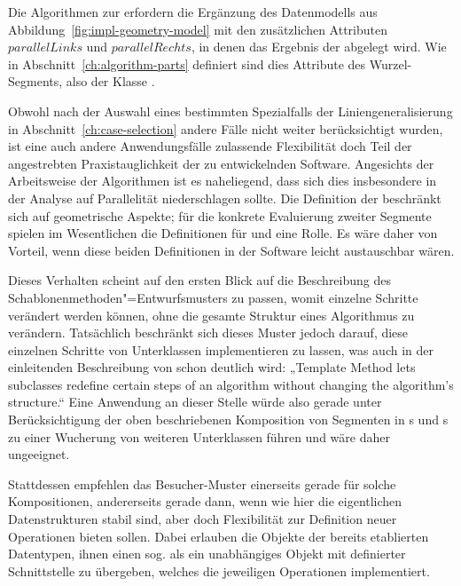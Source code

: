\documentclass[../main/thesis.tex]{subfiles}
\begin{document}
Die Algorithmen zur  erfordern die Ergänzung des Datenmodells aus Abbildung~\ref{fig:impl-geometry-model} mit den zusätzlichen Attributen $parallelLinks$ und $parallelRechts$, in denen das Ergebnis der  abgelegt wird.
Wie in Abschnitt~\ref{ch:algorithm-parts} definiert sind dies Attribute des Wurzel-Segments, also der Klasse .

Obwohl nach der Auswahl eines bestimmten Spezialfalls der Liniengeneralisierung in Abschnitt~\ref{ch:case-selection} andere Fälle nicht weiter berücksichtigt wurden, ist eine auch andere Anwendungsfälle zulassende Flexibilität doch Teil der angestrebten Praxistauglichkeit der zu entwickelnden Software.
Angesichts der Arbeitsweise der Algorithmen ist es naheliegend, dass sich dies insbesondere in der Analyse auf Parallelität niederschlagen sollte.
Die Definition der  beschränkt sich auf geometrische Aspekte; für die konkrete Evaluierung zweiter Segmente spielen im Wesentlichen die Definitionen für  und  eine Rolle.
Es wäre daher von Vorteil, wenn diese beiden Definitionen in der Software leicht austauschbar wären.

Dieses Verhalten scheint auf den ersten Blick auf die Beschreibung des Schablonenmethoden"=Entwurfsmusters  zu passen, womit einzelne Schritte verändert werden können, ohne die gesamte Struktur eines Algorithmus zu verändern.
Tatsächlich beschränkt sich dieses Muster jedoch darauf, diese einzelnen Schritte von Unterklassen implementieren zu lassen, was auch in der einleitenden Beschreibung von \citeauthor{GHJV95} schon deutlich wird:
„Template Method lets subclasses redefine certain steps of an algorithm without changing the algorithm's structure.“ 
Eine Anwendung an dieser Stelle würde also gerade unter Berücksichtigung der oben beschriebenen Komposition von Segmenten in s und s zu einer Wucherung von weiteren Unterklassen führen und wäre daher ungeeignet.

Stattdessen empfehlen \citeauthor{GHJV95} das Besucher-Muster  einerseits gerade für solche Kompositionen, andererseits gerade dann, wenn wie hier die eigentlichen Datenstrukturen stabil sind, aber doch Flexibilität zur Definition neuer Operationen bieten sollen. 
Dabei erlauben die Objekte der bereits etablierten Datentypen, ihnen einen sog.  als ein unabhängiges Objekt mit definierter Schnittstelle zu übergeben, welches die jeweiligen Operationen implementiert. 
\end{document}
